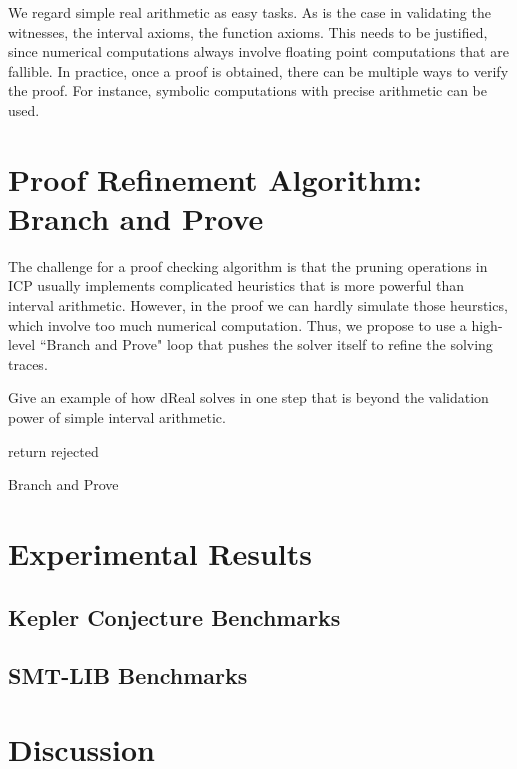 \documentclass[envcountsect]{llncs}
\begin{document}
\begin{remark}
We regard simple real arithmetic as easy tasks. 
As is the case in validating the witnesses, the interval axioms, the function
axioms. This needs to be justified, since numerical computations always involve
floating point computations that are fallible. In practice, once a proof is
obtained, there can be multiple ways to verify the proof. For instance, symbolic
computations with precise arithmetic can be used.  
\end{remark}

\section{Proof Refinement Algorithm: Branch and Prove}

The challenge for a proof checking algorithm is that the pruning operations in
ICP usually implements complicated heuristics that is more powerful than
interval arithmetic. However, in the proof we can hardly simulate those
heurstics, which involve too much numerical computation. Thus, we propose to use
a high-level ``Branch and Prove" loop that pushes the solver itself to refine
the solving traces. 

\begin{example}
Give an example of how dReal solves in one step that is beyond the validation
power of simple interval arithmetic. 
\end{example}

\begin{algorithm}\label{algo1}
\BlankLine
{}
return {\sf rejected}\;
\caption{Branch and Prove}
\end{algorithm}


\section{Experimental Results}

\subsection{Kepler Conjecture Benchmarks}

\subsection{SMT-LIB Benchmarks}

\section{Discussion}



\end{document}
